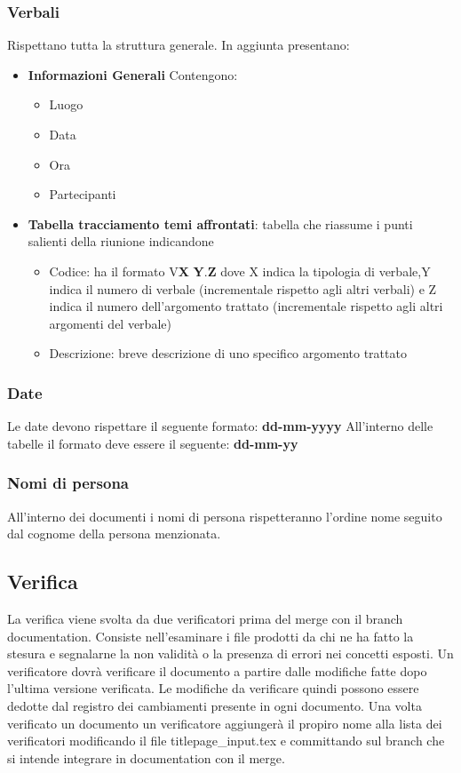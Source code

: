 \subsubsection{Verbali}
Rispettano tutta la struttura generale.
In aggiunta presentano:
\begin{itemize} 
    \item \textbf{Informazioni Generali}
    Contengono:
    \begin{itemize} 
        \item Luogo
        \item Data
        \item Ora
        \item Partecipanti
    \end{itemize}
\item \textbf{Tabella tracciamento temi affrontati}:
tabella che riassume i punti salienti della riunione indicandone
    \begin{itemize} 
        \item Codice: ha il formato V\textbf{X} \textbf{Y}.\textbf{Z} dove X indica la tipologia di verbale,Y indica il numero di verbale (incrementale rispetto agli altri verbali) 
        e Z indica il numero dell'argomento trattato (incrementale rispetto agli altri argomenti del verbale) 
        \item Descrizione: breve descrizione di uno specifico argomento trattato
    \end{itemize}

\end{itemize}

\subsubsection{Date}
Le date devono rispettare il seguente formato: \textbf{dd-mm-yyyy}
All'interno delle tabelle il formato deve essere il seguente: \textbf{dd-mm-yy}
\subsubsection{Nomi di persona}
All'interno dei documenti i nomi di persona rispetteranno l'ordine nome seguito dal cognome della persona menzionata.
\subsection{Verifica}
La verifica viene svolta da due verificatori prima del merge con il branch documentation.
Consiste nell'esaminare i file prodotti da chi ne ha fatto la stesura e segnalarne la non validità o 
la presenza di errori nei concetti esposti.
Un verificatore dovrà verificare il documento a partire dalle modifiche fatte dopo l'ultima versione verificata.
Le modifiche da verificare quindi possono essere dedotte dal registro dei cambiamenti presente in ogni documento.
Una volta verificato un documento un verificatore aggiungerà il propiro nome alla lista dei verificatori 
modificando il file titlepage\_input.tex e committando sul branch che si intende integrare in documentation con il merge.

